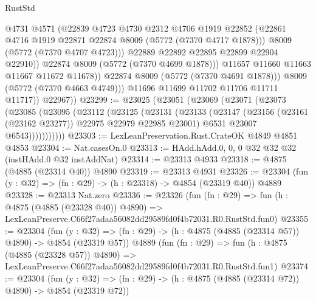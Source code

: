 \begin{lexlean}{RustStd}
\begin{coremodule}
                          @4731
                          @4571
                          (@22839
                            @4723
                            @4730
                            @2312
                            @4706
                            @1919
                            @22852
                            (@22861 @4716 @1919 @22871 @22874 @8009 (@5772 (@7370 @4717 @1878)))
                            @8009
                            (@5772 (@7370 @4707 @4723)))
                          @22889
                          @22892
                          @22895
                          @22899
                          @22904
                          @22910))
                      @22874
                      @8009
                      (@5772 (@7370 @4699 @1878)))
                    @11657
                    @11660
                    @11663
                    @11667
                    @11672
                    @11678))
                @22874
                @8009
                (@5772 (@7370 @4691 @1878)))
              @8009
              (@5772 (@7370 @4663 @4749)))
            @11696
            @11699
            @11702
            @11706
            @11711
            @11717))
        @22967))
@23299 := @23025
    (@23051
      (@23069
        (@23071
          (@23073
            (@23085
              (@23095
                (@23112
                  (@23125
                    (@23131
                      (@23133
                        (@23147
                          (@23156 (@23161 (@23162 @23277)) @22975 @22979 @22985 @23001)
                          @6531
                          @23007
                          @6543)))))))))))
@23303 := LexLeanPreservation.Rust.CrateOK @4849 @4851 @4853
@23304 := Nat.casesOn.{0}
@23313 := HAdd.hAdd.{0, 0, 0} @32 @32 @32 (instHAdd.{0} @32 instAddNat)
@23314 := @23313 @4933
@23318 := @4875 (@4885 (@23314 @40)) @4890
@23319 := @23313 @4931
@23326 := @23304 (fun (y : @32) => (fn : @29) -> (h : @23318) -> @4854 (@23319 @40)) @4889
@23328 := @23313 Nat.zero
@23336 := @23326
    (fun (fn : @29) =>
    fun (h : @4875 (@4885 (@23328 @40)) @4890) =>
    LexLeanPreserve.C66f27adaa56082dd29589fd0f4b72031.R0.RustStd.fun0)
@23355 := @23304
    (fun (y : @32) => (fn : @29) -> (h : @4875 (@4885 (@23314 @57)) @4890) -> @4854 (@23319 @57))
    @4889
    (fun (fn : @29) =>
    fun (h : @4875 (@4885 (@23328 @57)) @4890) =>
    LexLeanPreserve.C66f27adaa56082dd29589fd0f4b72031.R0.RustStd.fun1)
@23374 := @23304
    (fun (y : @32) => (fn : @29) -> (h : @4875 (@4885 (@23314 @72)) @4890) -> @4854 (@23319 @72))

\end{coremodule}
\end{lexlean}

